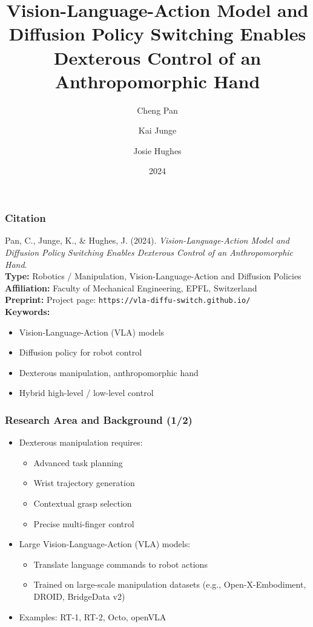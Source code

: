 \documentclass{beamer}
\title[Vision-Language-Action + Diffusion Switching]{Vision-Language-Action Model and Diffusion Policy Switching Enables Dexterous Control of an Anthropomorphic Hand}
\author[Pan, Junge, Hughes]{Cheng Pan \and Kai Junge \and Josie Hughes}
\institute[EPFL]{Faculty of Mechanical Engineering\\Swiss Federal Institute of Technology Lausanne (EPFL)\\Lausanne, Switzerland}
\date{2024}
\begin{document}
\begin{frame}
  \titlepage
\end{frame}

\begin{frame}
  \frametitle{Citation}
  \small
  Pan, C., Junge, K., \& Hughes, J. (2024). \textit{Vision-Language-Action Model and Diffusion Policy Switching Enables Dexterous Control of an Anthropomorphic Hand}.\\[0.4cm]

  \textbf{Type:} Robotics / Manipulation, Vision-Language-Action and Diffusion Policies\\[0.2cm]
  \textbf{Affiliation:} Faculty of Mechanical Engineering, EPFL, Switzerland\\[0.2cm]
  \textbf{Preprint:} Project page: \texttt{https://vla-diffu-switch.github.io/}\\[0.2cm]

  \textbf{Keywords:}
  \begin{itemize}
    \item Vision-Language-Action (VLA) models
    \item Diffusion policy for robot control
    \item Dexterous manipulation, anthropomorphic hand
    \item Hybrid high-level / low-level control
  \end{itemize}
\end{frame}

\begin{frame}
  \frametitle{Research Area and Background (1/2)}
  \small
  \begin{itemize}
    \item Dexterous manipulation requires:
      \begin{itemize}
        \item Advanced task planning
        \item Wrist trajectory generation
        \item Contextual grasp selection
        \item Precise multi-finger control
      \end{itemize}
    \item Large Vision-Language-Action (VLA) models:
      \begin{itemize}
        \item Translate language commands to robot actions
        \item Trained on large-scale manipulation datasets (e.g., Open-X-Embodiment, DROID, BridgeData v2)
      \end{itemize}
    \item Examples: RT-1, RT-2, Octo, openVLA
  \end{itemize}
\end{frame}
\end{document}

